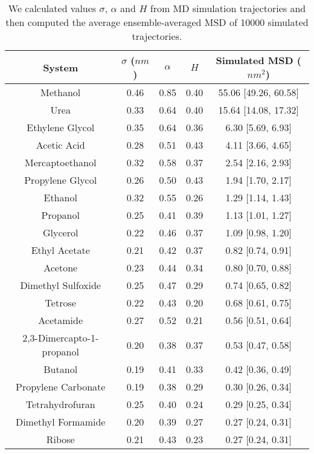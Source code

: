 \documentclass{article}
\begin{document}
  \begin{table}[h]
  \centering
  \begin{tabular}{ccccc}
  \toprule
  System & $\sigma$ ($nm$) & $\alpha$ & $H$ & Simulated MSD ($nm^2$)\\
  \midrule
  Methanol & 0.46 & 0.85 & 0.40 & 55.06 [49.26, 60.58] \\
  Urea & 0.33 & 0.64 & 0.40 & 15.64 [14.08, 17.32] \\
  Ethylene Glycol & 0.35 & 0.64 & 0.36 & 6.30 [5.69, 6.93] \\
  Acetic Acid & 0.28 & 0.51 & 0.43 & 4.11 [3.66, 4.65] \\
  Mercaptoethanol & 0.32 & 0.58 & 0.37 & 2.54 [2.16, 2.93] \\
  Propylene Glycol & 0.26 & 0.50 & 0.43 & 1.94 [1.70, 2.17] \\
  Ethanol & 0.32 & 0.55 & 0.26 & 1.29 [1.14, 1.43] \\
  Propanol & 0.25 & 0.41 & 0.39 & 1.13 [1.01, 1.27] \\
  Glycerol & 0.22 & 0.46 & 0.37 & 1.09 [0.98, 1.20] \\
  Ethyl Acetate & 0.21 & 0.42 & 0.37 & 0.82 [0.74, 0.91] \\
  Acetone & 0.23 & 0.44 & 0.34 & 0.80 [0.70, 0.88] \\
  Dimethyl Sulfoxide & 0.25 & 0.47 & 0.29 & 0.74 [0.65, 0.82] \\
  Tetrose & 0.22 & 0.43 & 0.20 & 0.68 [0.61, 0.75] \\
  Acetamide & 0.27 & 0.52 & 0.21 & 0.56 [0.51, 0.64] \\
  2,3-Dimercapto-1-propanol & 0.20 & 0.38 & 0.37 & 0.53 [0.47, 0.58] \\
  Butanol & 0.19 & 0.41 & 0.33 & 0.42 [0.36, 0.49] \\
  Propylene Carbonate & 0.19 & 0.38 & 0.29 & 0.30 [0.26, 0.34] \\
  Tetrahydrofuran & 0.25 & 0.40 & 0.24 & 0.29 [0.25, 0.34] \\
  Dimethyl Formamide & 0.20 & 0.39 & 0.27 & 0.27 [0.24, 0.31] \\
  Ribose & 0.21 & 0.43 & 0.23 & 0.27 [0.24, 0.31] \\
  \bottomrule
  \end{tabular}
  \caption{We calculated values $\sigma$, $\alpha$ and $H$ from MD simulation
  trajectories and then computed the average ensemble-averaged MSD of 10000 
  simulated trajectories.}\label{table:simulations}
  \end{table}
  
\end{document}
